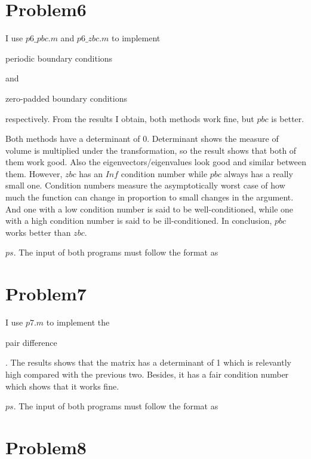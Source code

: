 \documentclass[11pt]{article}
\begin{document}
	\section{Problem6}
	\setlength{\parindent}{2em}
	\par I use $p6\_pbc.m$ and $p6\_zbc.m$ to implement \begin{itshape}periodic boundary conditions\end{itshape} and \begin{itshape}zero-padded boundary conditions\end{itshape} respectively. From the results I obtain, both methods work fine, but $pbc$ is better.
	\par Both methods have a determinant of 0. Determinant shows the measure of volume is multiplied under the transformation, so the result shows that both of them work good. Also the eigenvectors/eigenvalues look good and similar between them. However, $zbc$ has an $Inf$ condition number while $pbc$ always has a really small one. Condition numbers measure the asymptotically worst case of how much the function can change in proportion to small changes in the argument. And one with a low condition number is said to be well-conditioned, while one with a high condition number is said to be ill-conditioned. In conclusion, $pbc$ works better than $zbc$.
	\par $ps.$ The input of both programs must follow the format as \begin{itshape}[1 2 3 4 5 6]\end{itshape}
	\section{Problem7}
	\setlength{\parindent}{2em}
	\par I use $p7.m$ to implement the \begin{itshape}pair difference\end{itshape}. The results shows that the matrix has a determinant of 1 which is relevantly high compared with the previous two. Besides, it has a fair condition number which shows that it works fine.
	\par $ps.$ The input of both programs must follow the format as \begin{itshape}[1 2 3 4 5 6]\end{itshape}
	\section{Problem8}
	\setlength{\parindent}{2em}
\end{document}
